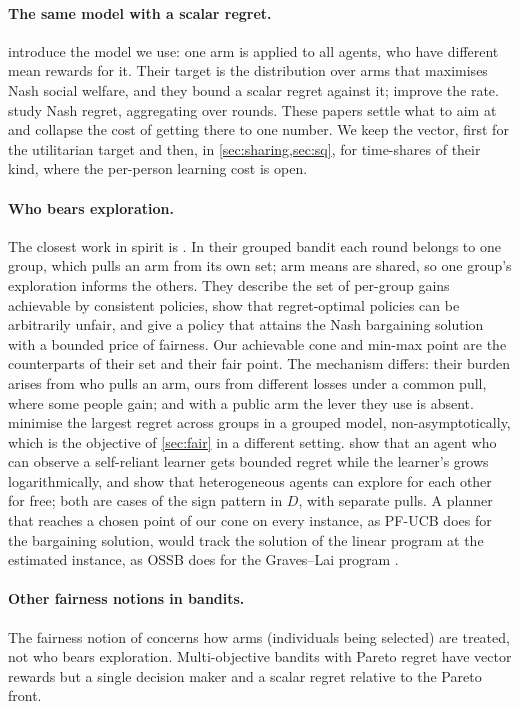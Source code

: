 \documentclass[11pt,a4paper]{article}
\theoremstyle{plain}
\theoremstyle{definition}
\theoremstyle{remark}
\begin{document}
\paragraph{The same model with a scalar regret.} \citet{hossain2021} introduce the model we use: one arm is applied to all agents, who have different mean rewards for it. Their target is the distribution over arms that maximises Nash social welfare, and they bound a scalar regret against it; \citet{jones2023} improve the rate. \citet{barman2023} study Nash regret, aggregating over rounds. These papers settle what to aim at and collapse the cost of getting there to one number. We keep the vector, first for the utilitarian target and then, in \cref{sec:sharing,sec:sq}, for time-shares of their kind, where the per-person learning cost is open.

\paragraph{Who bears exploration.} The closest work in spirit is \citet{baek2021,baek2024}. In their grouped bandit each round belongs to one group, which pulls an arm from its own set; arm means are shared, so one group's exploration informs the others. They describe the set of per-group gains achievable by consistent policies, show that regret-optimal policies can be arbitrarily unfair, and give a policy that attains the Nash bargaining solution with a bounded price of fairness. Our achievable cone and min-max point are the counterparts of their set and their fair point. The mechanism differs: their burden arises from who pulls an arm, ours from different losses under a common pull, where some people gain; and with a public arm the lever they use is absent. \citet{blanchard2025} minimise the largest regret across groups in a grouped model, non-asymptotically, which is the objective of \cref{sec:fair} in a different setting. \citet{jung2020} show that an agent who can observe a self-reliant learner gets bounded regret while the learner's grows logarithmically, and \citet{wang2023} show that heterogeneous agents can explore for each other for free; both are cases of the sign pattern in $D$, with separate pulls. A planner that reaches a chosen point of our cone on every instance, as PF-UCB does for the bargaining solution, would track the solution of the linear program at the estimated instance, as OSSB does for the Graves--Lai program \citep{combes2017,degenne2020}.

\paragraph{Other fairness notions in bandits.} The fairness notion of \citet{joseph2016} concerns how arms (individuals being selected) are treated, not who bears exploration. Multi-objective bandits with Pareto regret \citep{drugan2013} have vector rewards but a single decision maker and a scalar regret relative to the Pareto front.
\end{document}
